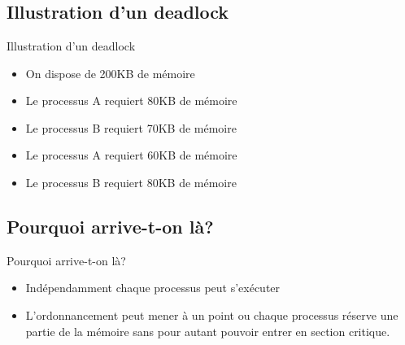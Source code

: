 \section{\sectitle}
\begin{frame}{\sectitle}

\def\subsectitle{Illustration d'un deadlock}
\subsection{\subsectitle}

\begin{alertblock}{\subsectitle}
\begin{itemize}
\item On dispose de 200KB de mémoire
\item Le processus A requiert 80KB de mémoire
\item Le processus B requiert 70KB de mémoire
\item Le processus A requiert 60KB de mémoire
\item Le processus B requiert 80KB de mémoire
\end{itemize}
\end{alertblock}

\def\subsectitle{Pourquoi arrive-t-on là?}
\subsection{\subsectitle}
\begin{block}{\subsectitle}
\begin{itemize}
    \item Indépendamment chaque processus peut s'exécuter
    \item L'ordonnancement peut mener à un point ou chaque processus réserve une
    partie de la mémoire sans pour autant pouvoir entrer en section critique.
\end{itemize}
\end{block}

\end{frame}


\def\sectitle{Exemple avec deux sémaphores}
